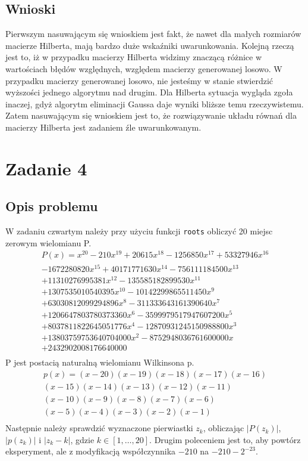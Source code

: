 \documentclass{article}
\begin{document}
\begin{center}
    \subsection{Wnioski}
    \large Pierwszym nasuwającym się wnioskiem jest fakt, że nawet dla małych rozmiarów macierze Hilberta, 
     mają bardzo duże wskaźniki uwarunkowania. Kolejną rzeczą jest to, iż w przypadku macierzy Hilberta widzimy znaczącą 
     różnice w wartościach błędów względnych, względem macierzy generowanej losowo.
     W przypadku macierzy generowanej losowo, nie jesteśmy w stanie stwierdzić wyższości jednego algorytmu nad drugim.
     Dla Hilberta sytuacja wygląda zgoła inaczej, gdyż algorytm eliminacji Gaussa daje wyniki bliższe temu rzeczywistemu.
     Zatem nasuwającym się wnioskiem jest to, że rozwiązywanie układu równań dla macierzy Hilberta jest zadaniem źle uwarunkowanym.

    \section{Zadanie 4}
    \subsection{Opis problemu}
    \large W zadaniu czwartym należy przy użyciu funkcji \texttt{roots} obliczyć 20 miejsc zerowym wielomianu P.
   \[ 
    \begin{array}{c}
        P(x) = x^{20} - 210x^{19} + 20615x^{18} -1256850x^{17} + 53327946x^{16} \\
         - 1672280820x^{15} + 40171771630x^{14} - 756111184500x^{13} \\
         + 11310276995381x^{12} - 135585182899530x^{11} \\
         + 1307535010540395x^{10} - 10142299865511450x^{9} \\
         + 63030812099294896x^{8} - 311333643161390640x^{7} \\
         + 1206647803780373360x^{6} - 3599979517947607200x^{5} \\
         + 8037811822645051776x^{4} - 12870931245150988800x^{3} \\ 
         + 13803759753640704000x^{2} - 8752948036761600000x \\
         + 2432902008176640000 \\
    \end{array}
    \]
    \large P jest postacią naturalną wielomianu Wilkinsona p.
    \[ 
    \begin{array}{c}
        p(x) = (x - 20)(x - 19)(x - 18)(x - 17)(x - 16) \\
                (x - 15)(x - 14)(x - 13)(x - 12)(x - 11) \\
                     (x - 10)(x - 9)(x - 8)(x - 7)(x - 6) \\
                       (x - 5)(x - 4)(x - 3)(x - 2)(x - 1) \\ 
    \end{array}
    \]
    \large Następnie należy sprawdzić wyznaczone pierwiastki \(z_{k}\), 
     obliczając \(|P(z_{k})|\), \(|p(z_k)|\) i \(|z_{k} - k|\), gdzie \(k \in [1,\ldots,20]\). 
     Drugim poleceniem jest to, aby powtórz eksperyment, ale z modyfikacją współczynnika \(-210\) na \(-210-2^{-23}\).

\end{center}
\end{document}
